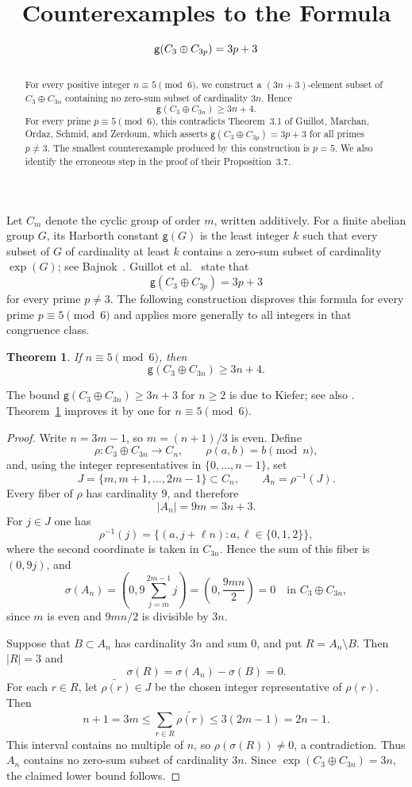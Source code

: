 \documentclass[11pt]{amsart}
\title[Counterexamples to a Harborth formula]
{Counterexamples to the Formula $\gH(C_3\oplus C_{3p})=3p+3$}
\date{}
\newtheorem{theorem}{Theorem}
\theoremstyle{remark}
\newcommand{\gH}{\mathsf{g}}
\begin{document}
\begin{abstract}
For every positive integer $n\equiv5\pmod6$, we construct a
$(3n+3)$-element subset of $C_3\oplus C_{3n}$ containing no zero-sum
subset of cardinality $3n$. Hence
\[
  \gH(C_3\oplus C_{3n})\ge 3n+4.
\]
For every prime $p\equiv5\pmod6$, this contradicts Theorem~3.1 of
Guillot, Marchan, Ordaz, Schmid, and Zerdoum, which asserts
$\gH(C_3\oplus C_{3p})=3p+3$ for all primes $p\ne3$.
The smallest counterexample produced by this construction is $p=5$. We
also identify the erroneous step in the proof of their
Proposition~3.7.
\end{abstract}

\maketitle

Let $C_m$ denote the cyclic group of order $m$, written additively.
For a finite abelian group $G$, its Harborth constant $\gH(G)$ is the
least integer $k$ such that every subset of $G$ of cardinality at least
$k$ contains a zero-sum subset of cardinality $\exp(G)$; see
Bajnok~\cite[Chapter~F.3]{Bajnok}. Guillot et
al.~\cite[Theorem~3.1]{GuillotEtAl} state that
\[
  \gH(C_3\oplus C_{3p})=3p+3
\]
for every prime $p\ne3$. The following construction disproves this
formula for every prime $p\equiv5\pmod6$ and applies more generally to
all integers in that congruence class.

\begin{theorem}\label{thm:main}
If $n\equiv5\pmod6$, then
\[
  \gH(C_3\oplus C_{3n})\ge 3n+4.
\]
\end{theorem}

The bound $\gH(C_3\oplus C_{3n})\ge3n+3$ for $n\ge2$ is due to Kiefer;
see also \cite[Prop.~F.104]{Bajnok}. Theorem~\ref{thm:main} improves it
by one for $n\equiv5\pmod6$.

\begin{proof}
Write $n=3m-1$, so $m=(n+1)/3$ is even. Define
\[
  \rho:C_3\oplus C_{3n}\longrightarrow C_n,
  \qquad \rho(a,b)=b\pmod n,
\]
and, using the integer representatives in $\{0,\ldots,n-1\}$, set
\[
  J=\{m,m+1,\ldots,2m-1\}\subset C_n,
  \qquad A_n=\rho^{-1}(J).
\]
Every fiber of $\rho$ has cardinality $9$, and therefore
\[
  |A_n|=9m=3n+3.
\]
For $j\in J$ one has
\[
  \rho^{-1}(j)
  =\{(a,j+\ell n):a,\ell\in\{0,1,2\}\},
\]
where the second coordinate is taken in $C_{3n}$. Hence the sum of this
fiber is $(0,9j)$, and
\[
  \sigma(A_n)
  =\left(0,9\sum_{j=m}^{2m-1}j\right)
  =\left(0,\frac{9mn}{2}\right)
  =0
  \quad\text{in }C_3\oplus C_{3n},
\]
since $m$ is even and $9mn/2$ is divisible by $3n$.

Suppose that $B\subset A_n$ has cardinality $3n$ and sum $0$, and put
$R=A_n\setminus B$. Then $|R|=3$ and
\[
  \sigma(R)=\sigma(A_n)-\sigma(B)=0.
\]
For each $r\in R$, let $\widetilde{\rho(r)}\in J$ be the chosen integer
representative of $\rho(r)$. Then
\[
  n+1=3m
  \le \sum_{r\in R}\widetilde{\rho(r)}
  \le 3(2m-1)=2n-1.
\]
This interval contains no multiple of $n$, so
$\rho(\sigma(R))\ne0$, a contradiction. Thus $A_n$ contains no
zero-sum subset of cardinality $3n$. Since
$\exp(C_3\oplus C_{3n})=3n$, the claimed lower bound follows.
\end{proof}
\end{document}
